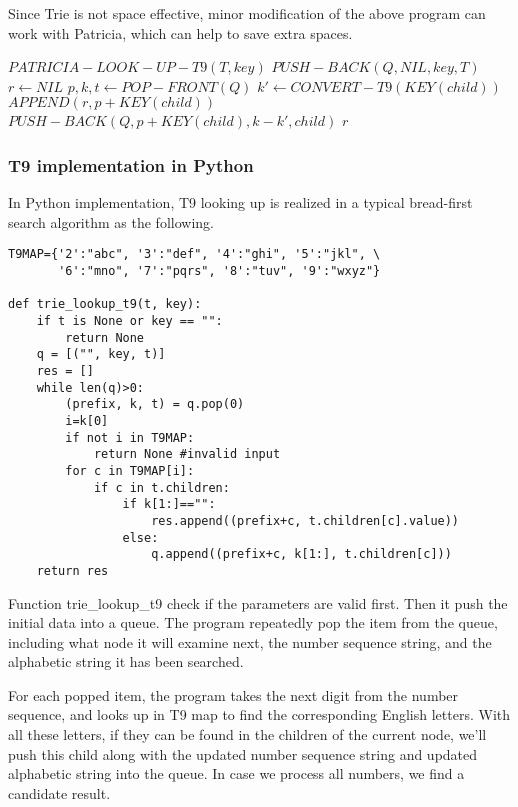 \documentclass{article}
\begin{document}
Since Trie is not space effective, minor modification of the above program can
work with Patricia, which can help to save extra spaces.

\begin{algorithmic}
\STATE $PATRICIA-LOOK-UP-T9(T, key)$
  \STATE $PUSH-BACK(Q, NIL, key, T)$
  \STATE $r \leftarrow NIL$
    \STATE $p, k, t \leftarrow POP-FRONT(Q)$
      \STATE $k' \leftarrow CONVERT-T9(KEY(child))$
          \STATE $APPEND(r, p+KEY(child))$
        \ELSE
          \STATE $PUSH-BACK(Q, p+KEY(child), k-k', child)$
        \ENDIF
      \ENDIF
    \ENDFOR
  \ENDWHILE
  \RETURN $r$
\end{algorithmic}

\subsubsection*{T9 implementation in Python}

In Python implementation, T9 looking up is realized in a typical bread-first search algorithm as the following.

\lstset{language=Python}
\begin{lstlisting}
T9MAP={'2':"abc", '3':"def", '4':"ghi", '5':"jkl", \
       '6':"mno", '7':"pqrs", '8':"tuv", '9':"wxyz"}
                
def trie_lookup_t9(t, key):
    if t is None or key == "":
        return None
    q = [("", key, t)]
    res = []
    while len(q)>0:
        (prefix, k, t) = q.pop(0)
        i=k[0]
        if not i in T9MAP:
            return None #invalid input
        for c in T9MAP[i]:
            if c in t.children:
                if k[1:]=="":
                    res.append((prefix+c, t.children[c].value))
                else:
                    q.append((prefix+c, k[1:], t.children[c]))
    return res
\end{lstlisting}

Function trie\_lookup\_t9 check if the parameters are valid first. Then
it push the initial data into a queue. The program repeatedly pop the item
from the queue, including what node it will examine next, the number sequence
string, and the alphabetic string it has been searched.

For each popped item, the program takes the next digit from the number
sequence, and looks up in T9 map to find the corresponding English letters.
With all these letters, if they can be found in the children of the current
node, we'll push this child along with the updated number sequence string
and updated alphabetic string into the queue. In case we process all 
numbers, we find a candidate result.
\end{document}
